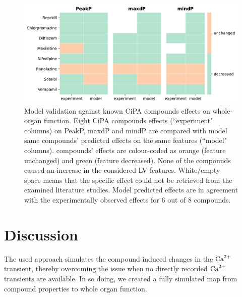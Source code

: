 \begin{figure}[ht!]
    \myfloatalign
    \includegraphics[width=1\textwidth]{figures/chapter06/model_vs_experiments.pdf}
    \caption{Model validation against known CiPA compounds effects on whole-organ function. Eight CiPA compounds effects (``experiment" columns) on PeakP, maxdP and mindP are compared with model same compounds' predicted effects on the same features (``model" columns). compounds' effects are colour-coded as orange (feature unchanged) and green (feature decreased). None of the compounds caused an increase in the considered LV features. White/empty space means that the specific effect could not be retrieved from the examined literature studies. Model predicted effects are in agreement with the experimentally observed effects for $6$ out of $8$ compounds.}
    \label{fig:validationtable}
\end{figure}




%
%
%
\section{Discussion}\label{sec:ch6discussion}
The used approach simulates the compound induced changes in the $\textrm{Ca}^{2+}$ transient, thereby overcoming the issue when no directly recorded $\textrm{Ca}^{2+}$ transients are available. In so doing, we created a fully simulated map from compound properties to whole organ function.


%
%
%
